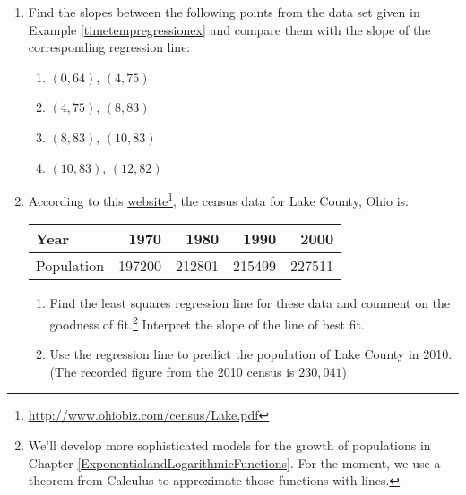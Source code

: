 \documentclass{ximera}
\begin{document}
\begin{enumerate}

\setcounter{enumi}{\value{HW}}

\item  Find the slopes between the following points from the data set given in Example \ref{timetempregressionex} and compare them with the slope of the corresponding regression line:

\begin{multicols}{4}

\begin{enumerate}

\item  $(0, 64)$, $(4, 75)$

\item  $(4, 75)$, $(8, 83)$

\item  $(8, 83)$, $(10, 83)$

\item  $(10, 83)$, $(12, 82)$

\end{enumerate}

\end{multicols}

\item According to this \href{http://www.ohiobiz.com/census/Lake.pdf}{\underline{website}}\footnote{\href{http://www.ohiobiz.com/census/Lake.pdf}{\underline{http://www.ohiobiz.com/census/Lake.pdf}}}, the census data for Lake County, Ohio is:

\noindent \begin{tabular}{|l|r|r|r|r|} \hline
Year & 1970 & 1980 & 1990 & 2000 \\
\hline
Population & 197200 & 212801 & 215499 & 227511 \\ \hline
\end{tabular}

\begin{enumerate}


\item  Find the least squares regression line for these data and comment on the goodness of fit.\footnote{We'll develop more sophisticated models for the growth of populations in Chapter \ref{ExponentialandLogarithmicFunctions}.  For the moment, we use a theorem from Calculus to approximate those functions with lines.} Interpret the slope of the line of best fit.

\item  Use the regression line to predict the population of Lake County in 2010.  (The recorded figure from the 2010 census is $230,\!041$)


\end{enumerate}
\end{enumerate}
\end{document}

